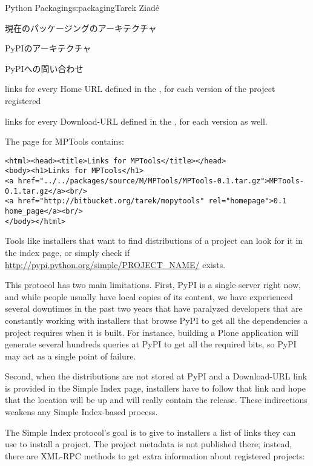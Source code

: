 \begin{aosachapter}{Python Packaging}{s:packaging}{Tarek Ziad\'{e}}
\begin{aosasect1}{現在のパッケージングのアーキテクチャ}
\begin{aosasect2}{PyPIのアーキテクチャ}
\begin{aosasect3}{PyPIへの問い合わせ}
\begin{aosaitemize}
  \item links for every Home URL defined in the , for
  each version of the project registered

  \item links for every Download-URL defined in the , for
  each version as well.

\end{aosaitemize}

\noindent
The page for MPTools contains:

\begin{verbatim}
<html><head><title>Links for MPTools</title></head>
<body><h1>Links for MPTools</h1>
<a href="../../packages/source/M/MPTools/MPTools-0.1.tar.gz">MPTools-0.1.tar.gz</a><br/>
<a href="http://bitbucket.org/tarek/mopytools" rel="homepage">0.1 home_page</a><br/>
</body></html>
\end{verbatim}

\noindent
Tools like installers that want to find distributions of a project can
look for it in the index page, or simply check if
\url{http://pypi.python.org/simple/PROJECT_NAME/} exists.

This protocol has two main limitations.  First, PyPI is a single
server right now, and while people usually have local copies of its
content, we have experienced several downtimes in the past two years
that have paralyzed developers that are constantly working with
installers that browse PyPI to get all the dependencies a project
requires when it is built. For instance, building a Plone application
will generate several hundreds queries at PyPI to get all the required
bits, so PyPI may act as a single point of failure.

Second, when the distributions are not stored at PyPI and a
Download-URL link is provided in the Simple Index page, installers
have to follow that link and hope that the location will be up and
will really contain the release. These indirections weakens any Simple
Index-based process.

The Simple Index protocol's goal is to give to installers a list of
links they can use to install a project. The project metadata is not
published there; instead, there are XML-RPC methods to get extra
information about registered projects:


\end{aosasect3}
\end{aosasect2}
\end{aosasect1}
\end{aosachapter}
